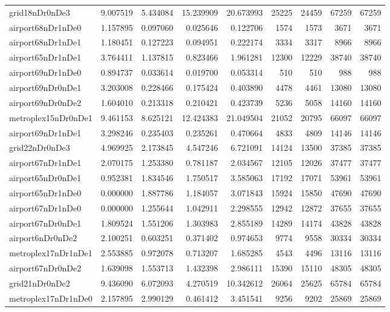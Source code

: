 \begin{longtable}{|l|r|r|r|r|r|r|r|r|}
grid18nDr0nDe3 & 9.007519 & 5.434084 & 15.239909 & 20.673993 & 25225 & 24459 & 67259 & 67259 \\
airport68nDr1nDe0 & 1.157895 & 0.097060 & 0.025646 & 0.122706 & 1574 & 1573 & 3671 & 3671 \\
airport68nDr1nDe1 & 1.180451 & 0.127223 & 0.094951 & 0.222174 & 3334 & 3317 & 8966 & 8966 \\
airport65nDr1nDe1 & 3.764411 & 1.137815 & 0.823466 & 1.961281 & 12300 & 12229 & 38740 & 38740 \\
airport69nDr1nDe0 & 0.894737 & 0.033614 & 0.019700 & 0.053314 & 510 & 510 & 988 & 988 \\
airport69nDr0nDe1 & 3.203008 & 0.228466 & 0.175424 & 0.403890 & 4478 & 4461 & 13080 & 13080 \\
airport69nDr0nDe2 & 1.604010 & 0.213318 & 0.210421 & 0.423739 & 5236 & 5058 & 14160 & 14160 \\
metroplex15nDr0nDe1 & 9.461153 & 8.625121 & 12.424383 & 21.049504 & 21052 & 20795 & 66097 & 66097 \\
airport69nDr1nDe1 & 3.298246 & 0.235403 & 0.235261 & 0.470664 & 4833 & 4809 & 14146 & 14146 \\
grid22nDr0nDe3 & 4.969925 & 2.173845 & 4.547246 & 6.721091 & 14124 & 13500 & 37385 & 37385 \\
airport67nDr1nDe1 & 2.070175 & 1.253380 & 0.781187 & 2.034567 & 12105 & 12026 & 37477 & 37477 \\
airport65nDr0nDe1 & 0.952381 & 1.834546 & 1.750517 & 3.585063 & 17192 & 17071 & 53961 & 53961 \\
airport65nDr1nDe0 & 0.000000 & 1.887786 & 1.184057 & 3.071843 & 15924 & 15850 & 47690 & 47690 \\
airport67nDr1nDe0 & 0.000000 & 1.255644 & 1.042911 & 2.298555 & 12942 & 12872 & 37655 & 37655 \\
airport67nDr0nDe1 & 1.809524 & 1.551206 & 1.303983 & 2.855189 & 14289 & 14174 & 43828 & 43828 \\
airport6nDr0nDe2 & 2.100251 & 0.603251 & 0.371402 & 0.974653 & 9774 & 9558 & 30334 & 30334 \\
metroplex17nDr1nDe1 & 2.553885 & 0.972078 & 0.713207 & 1.685285 & 4543 & 4496 & 13116 & 13116 \\
airport67nDr0nDe2 & 1.639098 & 1.553713 & 1.432398 & 2.986111 & 15390 & 15110 & 48305 & 48305 \\
grid21nDr0nDe2 & 9.436090 & 6.072093 & 4.270519 & 10.342612 & 26064 & 25625 & 65784 & 65784 \\
metroplex17nDr1nDe0 & 2.157895 & 2.990129 & 0.461412 & 3.451541 & 9256 & 9202 & 25869 & 25869 \\

\end{longtable}
